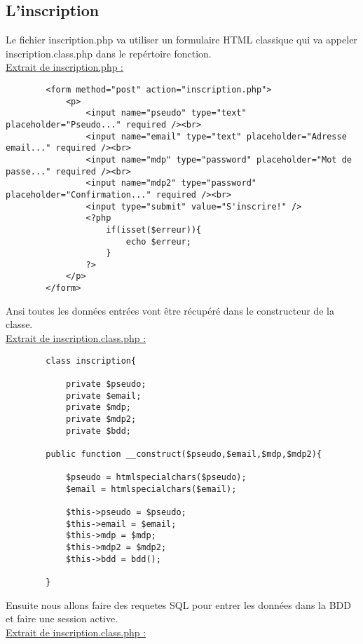 \documentclass{article}
\begin{document}
    \subsection{L'inscription}
    Le fichier inscription.php va utiliser un formulaire HTML classique qui va appeler inscription.class.php dans le repértoire fonction. \\
    \underline{Extrait de inscription.php :} 
    \begin{lstlisting}
        <form method="post" action="inscription.php">
            <p>
                <input name="pseudo" type="text" placeholder="Pseudo..." required /><br>
                <input name="email" type="text" placeholder="Adresse email..." required /><br>
                <input name="mdp" type="password" placeholder="Mot de passe..." required /><br>
                <input name="mdp2" type="password" placeholder="Confirmation..." required /><br>
                <input type="submit" value="S'inscrire!" />
                <?php 
                    if(isset($erreur)){
                        echo $erreur;
                    }
                ?>
            </p>
        </form>
    \end{lstlisting}
    Ansi toutes les données entrées vont être récupéré dans le constructeur de la classe. \\
    \underline{Extrait de inscription.class.php :}
    \begin{lstlisting}
        class inscription{
    
            private $pseudo;
            private $email;
            private $mdp;
            private $mdp2;
            private $bdd;
    
        public function __construct($pseudo,$email,$mdp,$mdp2){
    
            $pseudo = htmlspecialchars($pseudo);
            $email = htmlspecialchars($email);
        
            $this->pseudo = $pseudo; 
            $this->email = $email;
            $this->mdp = $mdp;
            $this->mdp2 = $mdp2;
            $this->bdd = bdd();
        
        }
    \end{lstlisting}
    Ensuite nous allons faire des requetes SQL pour entrer les données dans la BDD et faire une session active. 
    \\ \underline{Extrait de inscription.class.php :}
\end{document}
